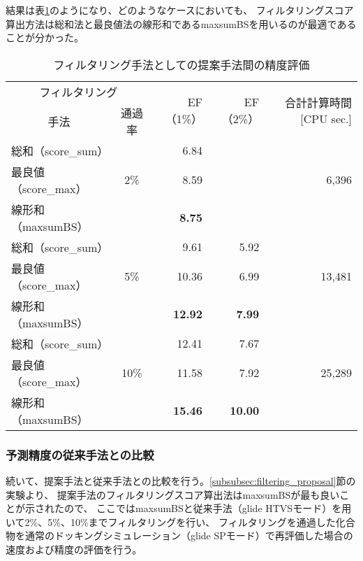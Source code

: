 結果は表\ref{table:filtering_proposal}のようになり、どのようなケースにおいても、
フィルタリングスコア算出方法は総和法と最良値法の線形和であるmaxsumBSを用いるのが最適であることが分かった。

\begin{table}[htb] \centering
	\caption{フィルタリング手法としての提案手法間の精度評価}
	\label{table:filtering_proposal}
	\begin{tabular}{lc|rr|r|}
	\multicolumn{2}{c|}{フィルタリング}	&\multirow{2}{*}{EF（1\%）}	&\multirow{2}{*}{EF（2\%）}	&\multirow{2}{*}{合計計算時間 [CPU sec.]}	\\
	\multicolumn{1}{c}{手法}	&通過率	&						&						&									\\ \hline
	総和（score\_sum）		&		&6.84					&\textendash				&									\\
	最良値（score\_max）	&2\%	&8.59					&\textendash				&6,396								\\
	線形和（maxsumBS）	&		&\textbf{8.75}				&\textendash				&									\\ \hline
	総和（score\_sum）		&		&9.61					&5.92					&									\\
	最良値（score\_max）	&5\%	&10.36					&6.99					&13,481								\\
	線形和（maxsumBS）	&		&\textbf{12.92}			&\textbf{7.99}				&									\\ \hline
	総和（score\_sum）		&		&12.41					&7.67					&									\\
	最良値（score\_max）	&10\%	&11.58					&7.92					&25,289								\\
	線形和（maxsumBS）	&		&\textbf{15.46}			&\textbf{10.00}			&									\\ \hline
	\end{tabular}
\end{table}


\subsubsection{予測精度の従来手法との比較}\label{subsubsec:filtering_comparison}
続いて、提案手法と従来手法との比較を行う。\ref{subsubsec:filtering_proposal}節の実験より、
提案手法のフィルタリングスコア算出法はmaxsumBSが最も良いことが示されたので、
ここではmaxsumBSと従来手法（glide HTVSモード）を用いて2\%、5\%、10\%までフィルタリングを行い、
フィルタリングを通過した化合物を通常のドッキングシミュレーション（glide SPモード）で再評価した場合の
速度および精度の評価を行う。

